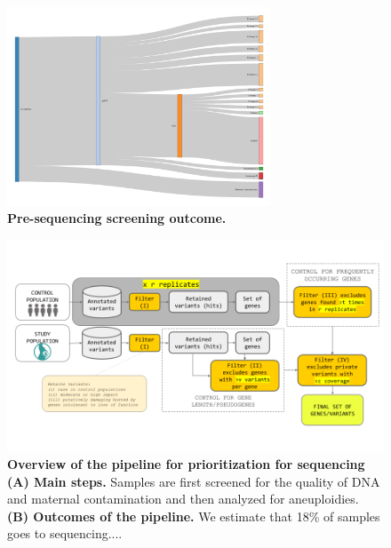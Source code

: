 
\begin{figure}[h]
\centering
\includegraphics[width=0.7\textwidth]{fig/IbelieveIcanFly.pdf}
\caption{\textbf{Pre-sequencing screening outcome.} }
\label{fig:presequencing}
\end{figure}

\begin{figure}[ht]
\centering
\includegraphics[width=\linewidth]{fig/pipeonly.png}
\caption{\textbf{Overview of the pipeline for prioritization for sequencing (A) Main steps.} Samples are first screened for the quality of DNA and maternal contamination and then analyzed for aneuploidies. \textbf{(B) Outcomes of the pipeline.} We estimate that 18\% of samples goes to sequencing....} 
\label{fig:pipeline}
\end{figure}


